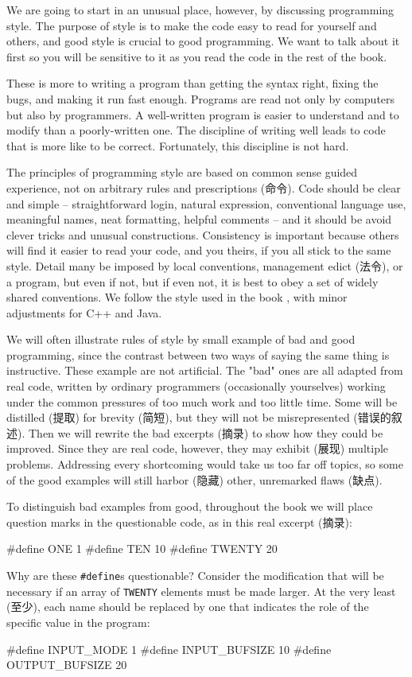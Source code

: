 We are going to start in an unusual place, however, by discussing
programming style. The purpose of style is to make the code easy to read
for yourself and others, and good style is crucial to good programming. We
want to talk about it first so you will be sensitive to it as you read the
code in the rest of the book.

These is more to writing a program than getting the syntax right, fixing
the bugs, and making it run fast enough. Programs are read not only by
computers but also by programmers. A well-written program is easier to
understand and to modify than a poorly-written one. The discipline of
writing well leads to code that is more like to be correct. Fortunately,
this discipline is not hard.

The principles of programming style are based on common sense guided
experience, not on arbitrary rules and prescriptions (命令). Code should be
clear and simple -- straightforward login, natural expression, conventional
language use, meaningful names, neat formatting, helpful comments -- and it
should be avoid clever tricks and unusual constructions. Consistency is
important because others will find it easier to read your code, and you
theirs, if you all stick to the same style. Detail many be imposed by local
conventions, management edict (法令), or a program, but even if not, but if
even not, it is best to obey a set of widely shared conventions. We follow
the style used in the book , with
minor adjustments for C++ and Java.

We will often illustrate rules of style by small example of bad and good
programming, since the contrast between two ways of saying the same thing
is instructive. These example are not artificial. The "bad" ones are all
adapted from real code, written by ordinary programmers (occasionally
yourselves) working under the common pressures of too much work and too
little time. Some will be distilled (提取) for brevity (简短), but they will
not be misrepresented (错误的叙述). Then we will rewrite the bad
excerpts (摘录) to show how they could be improved. Since they are real
code, however, they may exhibit (展现) multiple problems. Addressing every
shortcoming would take us too far off topics, so some of the good examples
will still harbor (隐藏) other, unremarked flaws (缺点).

To distinguish bad examples from good, throughout the book we will place
question marks in the questionable code, as in this real excerpt (摘录):
\begin{badcode}
    #define ONE 1
    #define TEN 10 
    #define TWENTY  20
\end{badcode}
Why are these \verb"#define"s questionable? Consider the modification that
will be necessary if an array of \verb"TWENTY" elements must be made
larger. At the very least (至少), each name should be replaced by one that
indicates the role of the specific value in the program:
\begin{wellcode}
    #define INPUT_MODE  1
    #define INPUT_BUFSIZE   10
    #define OUTPUT_BUFSIZE  20 
\end{wellcode}

